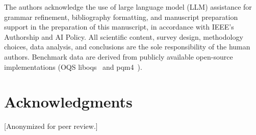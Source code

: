 \documentclass[journal]{IEEEtran}
\begin{document}
The authors acknowledge the use of large language model (LLM) assistance for
grammar refinement, bibliography formatting, and manuscript preparation support
in the preparation of this manuscript, in accordance with IEEE's Authorship and
AI Policy. All scientific content, survey design, methodology choices, data
analysis, and conclusions are the sole responsibility of the human authors.
Benchmark data are derived from publicly available open-source implementations
(OQS liboqs~\cite{oqs2024} and pqm4~\cite{kannwischer2019pqm4}).

\section*{Acknowledgments}

[Anonymized for peer review.]



\end{document}
